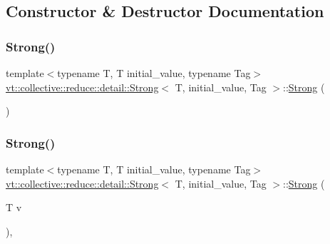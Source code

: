 \subsection{Constructor \& Destructor Documentation}
\mbox{\label{structvt_1_1collective_1_1reduce_1_1detail_1_1_strong_af1121c0e63f347e779f1cad333792056}} 
\subsubsection{\texorpdfstring{Strong()}{Strong()}\hspace{0.1cm}{\footnotesize\ttfamily [1/2]}}
{\footnotesize\ttfamily template$<$typename T, T initial\+\_\+value, typename Tag$>$ \\
\hyperlink{structvt_1_1collective_1_1reduce_1_1detail_1_1_strong}{vt\+::collective\+::reduce\+::detail\+::\+Strong}$<$ T, initial\+\_\+value, Tag $>$\+::\hyperlink{structvt_1_1collective_1_1reduce_1_1detail_1_1_strong}{Strong} (\begin{DoxyParamCaption}{ }\end{DoxyParamCaption})\hspace{0.3cm}{\ttfamily [default]}}

\mbox{\label{structvt_1_1collective_1_1reduce_1_1detail_1_1_strong_ad7d4a59581e1961b643c853c8e7c58c3}} 
\subsubsection{\texorpdfstring{Strong()}{Strong()}\hspace{0.1cm}{\footnotesize\ttfamily [2/2]}}
{\footnotesize\ttfamily template$<$typename T, T initial\+\_\+value, typename Tag$>$ \\
\hyperlink{structvt_1_1collective_1_1reduce_1_1detail_1_1_strong}{vt\+::collective\+::reduce\+::detail\+::\+Strong}$<$ T, initial\+\_\+value, Tag $>$\+::\hyperlink{structvt_1_1collective_1_1reduce_1_1detail_1_1_strong}{Strong} (\begin{DoxyParamCaption}\item[{T}]{v }\end{DoxyParamCaption})\hspace{0.3cm}{\ttfamily [inline]}, {\ttfamily [explicit]}}



